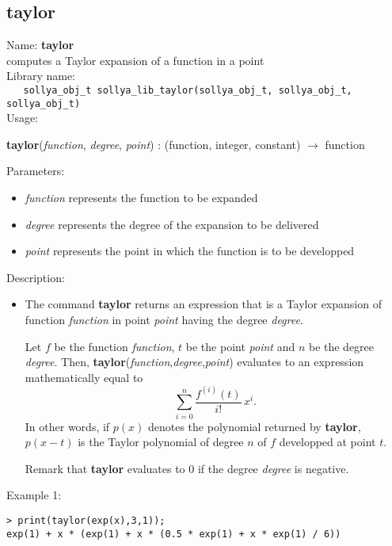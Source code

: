 \subsection{taylor}
\label{labtaylor}
\noindent Name: \textbf{taylor}\\
\phantom{aaa}computes a Taylor expansion of a function in a point\\[0.2cm]
\noindent Library name:\\
\verb|   sollya_obj_t sollya_lib_taylor(sollya_obj_t, sollya_obj_t, sollya_obj_t)|\\[0.2cm]
\noindent Usage: 
\begin{center}
\textbf{taylor}(\emph{function}, \emph{degree}, \emph{point}) : (\textsf{function}, \textsf{integer}, \textsf{constant}) $\rightarrow$ \textsf{function}\\
\end{center}
Parameters: 
\begin{itemize}
\item \emph{function} represents the function to be expanded
\item \emph{degree} represents the degree of the expansion to be delivered
\item \emph{point} represents the point in which the function is to be developped
\end{itemize}
\noindent Description: \begin{itemize}

\item The command \textbf{taylor} returns an expression that is a Taylor expansion
   of function \emph{function} in point \emph{point} having the degree \emph{degree}.
    
   Let $f$ be the function \emph{function}, $t$ be the point \emph{point} and
   $n$ be the degree \emph{degree}. Then, \textbf{taylor}(\emph{function},\emph{degree},\emph{point}) 
   evaluates to an expression mathematically equal to
   $$\sum\limits_{i=0}^n \frac{f^{(i)}\left(t\right)}{i!}\,x^i.$$
   In other words, if $p(x)$ denotes the polynomial returned by \textbf{taylor},
   $p(x-t)$ is the Taylor polynomial of degree $n$ of $f$ developped at point $t$.
    
   Remark that \textbf{taylor} evaluates to $0$ if the degree \emph{degree} is negative.
\end{itemize}
\noindent Example 1: 
\begin{center}\begin{minipage}{15cm}\begin{Verbatim}[frame=single,commandchars=\\\|\~]
> print(taylor(exp(x),3,1));
exp(1) + x * (exp(1) + x * (0.5 * exp(1) + x * exp(1) / 6))
\end{Verbatim}
\end{minipage}\end{center}
